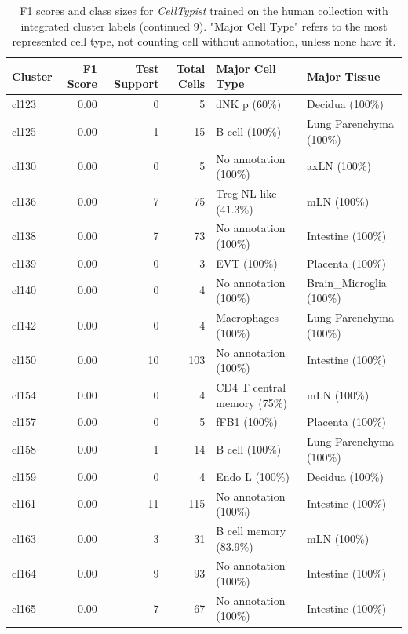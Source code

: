 \begin{table}[ht!]
\scriptsize
\caption[F1 scores and class sizes for \textit{CellTypist} trained on the human collection with integrated cluster labels (continued 9)]{F1 scores and class sizes for \textit{CellTypist} trained on the human collection with integrated cluster labels (continued 9). "Major Cell Type" refers to the most represented cell type, not counting cell without annotation, unless none have it.}
\centering
\label{table:tab_HAmodelclust9}
\begin{tabular}{lrrrll}
  \toprule
Cluster & F1 Score & Test Support & Total Cells & Major Cell Type & Major Tissue \\ 
  \midrule  
  cl123 & 0.00 &   0 &   5 & dNK p (60\%) & Decidua (100\%) \\ 
  cl125 & 0.00 &   1 &  15 & B cell (100\%) & Lung Parenchyma (100\%) \\ 
  cl130 & 0.00 &   0 &   5 & No annotation (100\%) & axLN (100\%) \\ 
  cl136 & 0.00 &   7 &  75 & Treg NL-like (41.3\%) & mLN (100\%) \\ 
  cl138 & 0.00 &   7 &  73 & No annotation (100\%) & Intestine (100\%) \\ 
  cl139 & 0.00 &   0 &   3 & EVT (100\%) & Placenta (100\%) \\ 
  cl140 & 0.00 &   0 &   4 & No annotation (100\%) & Brain\_Microglia (100\%) \\ 
  cl142 & 0.00 &   0 &   4 & Macrophages (100\%) & Lung Parenchyma (100\%) \\ 
  cl150 & 0.00 &  10 & 103 & No annotation (100\%) & Intestine (100\%) \\ 
  cl154 & 0.00 &   0 &   4 & CD4 T central memory (75\%) & mLN (100\%) \\ 
  cl157 & 0.00 &   0 &   5 & fFB1 (100\%) & Placenta (100\%) \\ 
  cl158 & 0.00 &   1 &  14 & B cell (100\%) & Lung Parenchyma (100\%) \\ 
  cl159 & 0.00 &   0 &   4 & Endo L (100\%) & Decidua (100\%) \\ 
  cl161 & 0.00 &  11 & 115 & No annotation (100\%) & Intestine (100\%) \\ 
  cl163 & 0.00 &   3 &  31 & B cell memory (83.9\%) & mLN (100\%) \\ 
  cl164 & 0.00 &   9 &  93 & No annotation (100\%) & Intestine (100\%) \\ 
  cl165 & 0.00 &   7 &  67 & No annotation (100\%) & Intestine (100\%) \\ 

\end{tabular}
\end{table}

